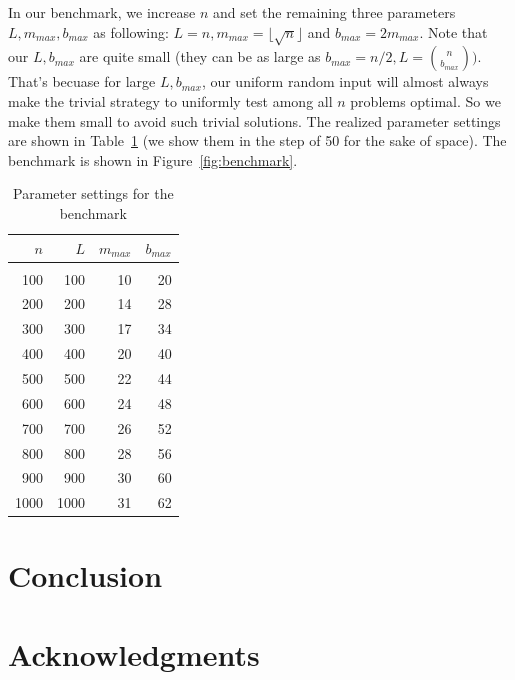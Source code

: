 \documentclass{article}
\begin{document}
In our benchmark, we increase $n$ and set the remaining three parameters $L,
m_{max}, b_{max}$ as following: $L = n, m_{max} = \lfloor \sqrt{n} \rfloor$ and
$b_{max} = 2m_{max}$. Note that our $L, b_{max}$ are quite small (they can be
as large as $b_{max} = n/2, L = \binom{n}{b_{max}})$. That's becuase for large $L,
b_{max}$, our uniform random input will almost always make the trivial strategy
to uniformly test among all $n$ problems optimal. So we make them small to
avoid such trivial solutions. The realized parameter settings are shown in
Table~\ref{tab:settings} (we show them in the step of 50 for the sake of
space). The benchmark is shown in Figure~\ref{fig:benchmark}.

\begin{table}
	\caption{Parameter settings for the benchmark}\label{tab:settings}
	\begin{center}
	\begin{tabular}{ r r r r }
		$n$&$L$&$m_{max}$&$b_{max}$\\
		\hline\\
		100&100&10&20\\
		200&200&14&28\\ 
		300&300&17&34\\
		400&400&20&40\\
		500&500&22&44\\
		600&600&24&48\\
		700&700&26&52\\
		800&800&28&56\\
		900&900&30&60\\
		1000&1000&31&62
	\end{tabular}
	\end{center}
\end{table}


\section{Conclusion}

\section*{Acknowledgments}
\end{document}
